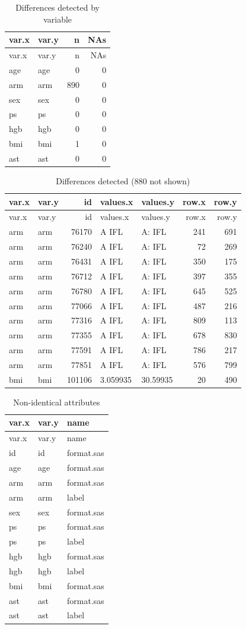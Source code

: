 \documentclass[
]{book}
\begin{document}
\begin{longtable}[]{@{}llrr@{}}
\caption{\label{tab:unnamed-chunk-28}Differences detected by variable}\tabularnewline
\toprule
var.x & var.y & n & NAs\tabularnewline
\midrule
\endfirsthead
\toprule
var.x & var.y & n & NAs\tabularnewline
\midrule
\endhead
age & age & 0 & 0\tabularnewline
arm & arm & 890 & 0\tabularnewline
sex & sex & 0 & 0\tabularnewline
ps & ps & 0 & 0\tabularnewline
hgb & hgb & 0 & 0\tabularnewline
bmi & bmi & 1 & 0\tabularnewline
ast & ast & 0 & 0\tabularnewline
\bottomrule
\end{longtable}

\begin{longtable}[]{@{}llrllrr@{}}
\caption{\label{tab:unnamed-chunk-28}Differences detected (880 not shown)}\tabularnewline
\toprule
var.x & var.y & id & values.x & values.y & row.x & row.y\tabularnewline
\midrule
\endfirsthead
\toprule
var.x & var.y & id & values.x & values.y & row.x & row.y\tabularnewline
\midrule
\endhead
arm & arm & 76170 & A IFL & A: IFL & 241 & 691\tabularnewline
arm & arm & 76240 & A IFL & A: IFL & 72 & 269\tabularnewline
arm & arm & 76431 & A IFL & A: IFL & 350 & 175\tabularnewline
arm & arm & 76712 & A IFL & A: IFL & 397 & 355\tabularnewline
arm & arm & 76780 & A IFL & A: IFL & 645 & 525\tabularnewline
arm & arm & 77066 & A IFL & A: IFL & 487 & 216\tabularnewline
arm & arm & 77316 & A IFL & A: IFL & 809 & 113\tabularnewline
arm & arm & 77355 & A IFL & A: IFL & 678 & 830\tabularnewline
arm & arm & 77591 & A IFL & A: IFL & 786 & 217\tabularnewline
arm & arm & 77851 & A IFL & A: IFL & 576 & 799\tabularnewline
bmi & bmi & 101106 & 3.059935 & 30.59935 & 20 & 490\tabularnewline
\bottomrule
\end{longtable}

\begin{longtable}[]{@{}lll@{}}
\caption{\label{tab:unnamed-chunk-28}Non-identical attributes}\tabularnewline
\toprule
var.x & var.y & name\tabularnewline
\midrule
\endfirsthead
\toprule
var.x & var.y & name\tabularnewline
\midrule
\endhead
id & id & format.sas\tabularnewline
age & age & format.sas\tabularnewline
arm & arm & format.sas\tabularnewline
arm & arm & label\tabularnewline
sex & sex & format.sas\tabularnewline
ps & ps & format.sas\tabularnewline
ps & ps & label\tabularnewline
hgb & hgb & format.sas\tabularnewline
hgb & hgb & label\tabularnewline
bmi & bmi & format.sas\tabularnewline
ast & ast & format.sas\tabularnewline
ast & ast & label\tabularnewline
\bottomrule
\end{longtable}
\end{document}
